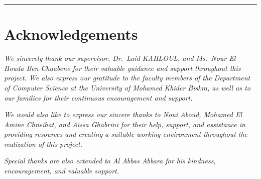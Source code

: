 \documentclass[12pt,a4paper]{article}
\begin{document}
\vspace{0.3cm}
\hrule
\vspace{0.2cm}
\section*{Acknowledgements}
\begin{center}
\small\textit{We sincerely thank our supervisor, Dr.\ Laid KAHLOUL, and Ms.\ Nour El Houda Ben Chaabene for their valuable guidance and support throughout this project. We also express our gratitude to the faculty members of the Department of Computer Science at the University of Mohamed Khider Biskra, as well as to our families for their continuous encouragement and support.}

\vspace{0.3cm}
\small\textit{We would also like to express our sincere thanks to Noui Aboud, Mohamed El Amine Chneihat, and Aissa Ghabrini for their help, support, and assistance in providing resources and creating a suitable working environment throughout the realization of this project.}

\vspace{0.3cm}
\small\textit{Special thanks are also extended to Al Abbas Abbara for his kindness, encouragement, and valuable support.}
\end{center}

\newpage

\tableofcontents
\newpage









\newpage


\end{document}

